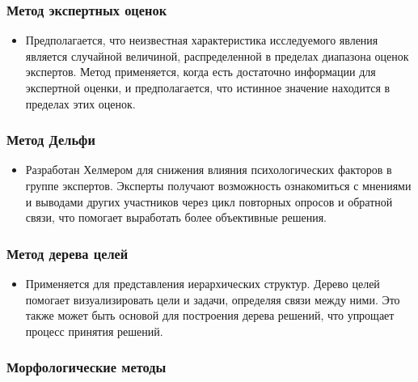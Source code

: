 \documentclass[
]{article}
\providecommand{\tightlist}{%
  \setlength{\itemsep}{0pt}\setlength{\parskip}{0pt}}
\begin{document}
\subsubsection{\texorpdfstring{\textbf{Метод экспертных
оценок}}{Метод экспертных оценок}}\label{ux43cux435ux442ux43eux434-ux44dux43aux441ux43fux435ux440ux442ux43dux44bux445-ux43eux446ux435ux43dux43eux43a}

\begin{itemize}
\tightlist
\item
  Предполагается, что неизвестная характеристика исследуемого явления
  является случайной величиной, распределенной в пределах диапазона
  оценок экспертов. Метод применяется, когда есть достаточно информации
  для экспертной оценки, и предполагается, что истинное значение
  находится в пределах этих оценок.
\end{itemize}

\subsubsection{\texorpdfstring{\textbf{Метод
Дельфи}}{Метод Дельфи}}\label{ux43cux435ux442ux43eux434-ux434ux435ux43bux44cux444ux438}

\begin{itemize}
\tightlist
\item
  Разработан Хелмером для снижения влияния психологических факторов в
  группе экспертов. Эксперты получают возможность ознакомиться с
  мнениями и выводами других участников через цикл повторных опросов и
  обратной связи, что помогает выработать более объективные решения.
\end{itemize}

\subsubsection{\texorpdfstring{\textbf{Метод дерева
целей}}{Метод дерева целей}}\label{ux43cux435ux442ux43eux434-ux434ux435ux440ux435ux432ux430-ux446ux435ux43bux435ux439}

\begin{itemize}
\tightlist
\item
  Применяется для представления иерархических структур. Дерево целей
  помогает визуализировать цели и задачи, определяя связи между ними.
  Это также может быть основой для построения дерева решений, что
  упрощает процесс принятия решений.
\end{itemize}

\subsubsection{\texorpdfstring{\textbf{Морфологические
методы}}{Морфологические методы}}\label{ux43cux43eux440ux444ux43eux43bux43eux433ux438ux447ux435ux441ux43aux438ux435-ux43cux435ux442ux43eux434ux44b}
\end{document}
